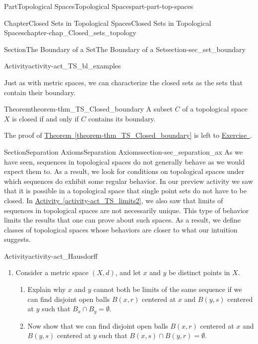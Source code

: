 \documentclass[oneside,10pt,]{book}
\newcommand{\xreffont}{\relax}
\numberwithin{equation}{chapter}
\begin{document}
\begin{partptx}{Part}{Topological Spaces}{}{Topological Spaces}{}{}{part-part-top-spaces}
\begin{chapterptx}{Chapter}{Closed Sets in Topological Spaces}{}{Closed Sets in Topological Spaces}{}{}{chapter-chap_Closed_sets_topology}
\begin{sectionptx}{Section}{The Boundary of a Set}{}{The Boundary of a Set}{}{}{section-sec_set_boundary}
\begin{activity}{Activity}{}{activity-act_TS_bl_examples}
\end{activity}%
Just as with metric spaces, we can characterize the closed sets as the sets that contain their boundary.%
\begin{theorem}{Theorem}{}{}{theorem-thm_TS_Closed_boundary}%
A subset \(C\) of a topological space \(X\) is closed if and only if \(C\) contains its boundary.%
\end{theorem}
The proof of \hyperref[theorem-thm_TS_Closed_boundary]{Theorem~{\xreffont\ref{theorem-thm_TS_Closed_boundary}}} is left to \hyperlink{exercise-ex_TS_Closed_boundary}{Exercise~{\xreffont 10}}.%
\end{sectionptx}
%
%
\typeout{************************************************}
\typeout{************************************************}
%
\begin{sectionptx}{Section}{Separation Axioms}{}{Separation Axioms}{}{}{section-sec_separation_ax}
As we have seen, sequences in topological spaces do not generally behave as we would expect them to. As a result, we look for conditions on topological spaces under which sequences do exhibit some regular behavior. In our preview activity we saw that it is possible in a topological space that single point sets do not have to be closed. In \hyperref[activity-act_TS_limits2]{Activity~{\xreffont\ref{activity-act_TS_limits2}}}, we also saw that limits of sequences in topological spaces are not necessarily unique. This type of behavior limits the results that one can prove about such spaces. As a result, we define classes of topological spaces whose behaviors are closer to what our intuition suggests.%
\begin{activity}{Activity}{}{activity-act_Hausdorff}%
\begin{enumerate}[font=\bfseries,label=(\alph*),ref=\alph*]%
\item{}Consider a metric space \((X,d)\), and let \(x\) and \(y\) be distinct points in \(X\).%
\begin{enumerate}[font=\bfseries,label=(\roman*),ref=\theenumi.\roman*]%
\item{}Explain why \(x\) and \(y\) cannot both be limits of the same sequence if we can find disjoint open balls \(B(x,r)\) centered at \(x\) and \(B(y,s)\) centered at \(y\) such that \(B_x \cap B_y = \emptyset\).%
\item{}Now show that we can find disjoint open balls \(B(x,r)\) centered at \(x\) and \(B(y,s)\) centered at \(y\) such that \(B(x,s) \cap B(y,r) = \emptyset\).%
\end{enumerate}%

\end{enumerate}
\end{activity}
\end{sectionptx}
\end{chapterptx}
\end{partptx}
\end{document}

